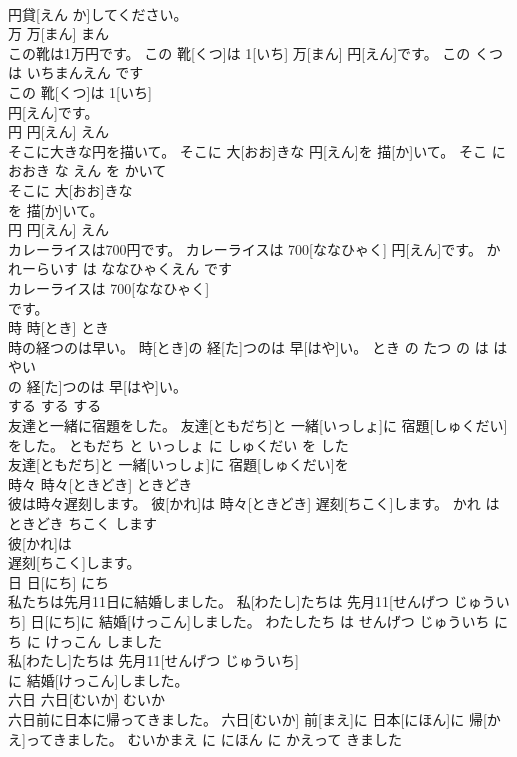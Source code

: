 \documentclass[8pt]{extreport}
\begin{document}
\begin{CJK}{UTF8}{min}
\\	円貸[えん か]してください。		
\\	万	万[まん]	まん	
\\	この靴は1万円です。	この 靴[くつ]は 1[いち] 万[まん] 円[えん]です。	この くつ は いちまんえん です	
\\	この 靴[くつ]は 1[いち]
\\	円[えん]です。		
\\	円	円[えん]	えん	
\\	そこに大きな円を描いて。	そこに 大[おお]きな 円[えん]を 描[か]いて。	そこ に おおき な えん を かいて	
\\	そこに 大[おお]きな
\\	を 描[か]いて。		
\\	円	円[えん]	えん	
\\	カレーライスは700円です。	カレーライスは 700[ななひゃく] 円[えん]です。	かれーらいす は ななひゃくえん です	
\\	カレーライスは 700[ななひゃく]
\\	です。		
\\	時	時[とき]	とき	
\\	時の経つのは早い。	時[とき]の 経[た]つのは 早[はや]い。	とき の たつ の は はやい	
\\	の 経[た]つのは 早[はや]い。		
\\	する	する	する	
\\	友達と一緒に宿題をした。	友達[ともだち]と 一緒[いっしょ]に 宿題[しゅくだい]をした。	ともだち と いっしょ に しゅくだい を した	
\\	友達[ともだち]と 一緒[いっしょ]に 宿題[しゅくだい]を
\\	時々	時々[ときどき]	ときどき	
\\	彼は時々遅刻します。	彼[かれ]は 時々[ときどき] 遅刻[ちこく]します。	かれ は ときどき ちこく します	
\\	彼[かれ]は
\\	遅刻[ちこく]します。		
\\	日	日[にち]	にち	
\\	私たちは先月11日に結婚しました。	私[わたし]たちは 先月11[せんげつ じゅういち] 日[にち]に 結婚[けっこん]しました。	わたしたち は せんげつ じゅういち にち に けっこん しました	
\\	私[わたし]たちは 先月11[せんげつ じゅういち]
\\	に 結婚[けっこん]しました。		
\\	六日	六日[むいか]	むいか	
\\	六日前に日本に帰ってきました。	六日[むいか] 前[まえ]に 日本[にほん]に 帰[かえ]ってきました。	むいかまえ に にほん に かえって きました	

\end{CJK}
\end{document}
